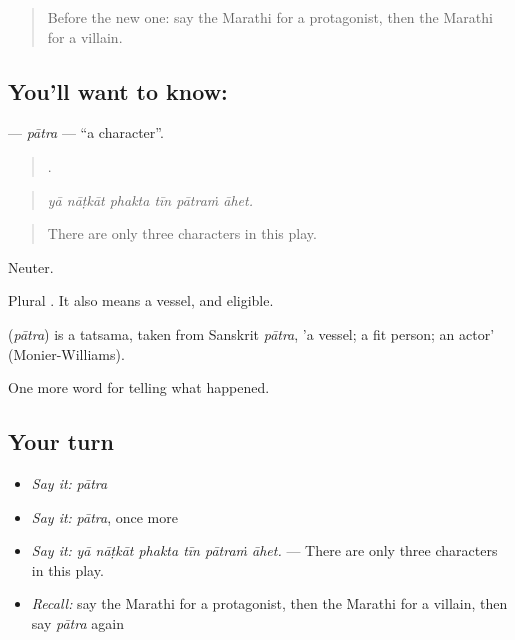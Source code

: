 \label{lesson:MR-C339-patra}



\begin{quote}
Before the new one: say the Marathi for a protagonist, then the Marathi for a villain.
\end{quote}

\subsection*{You'll want to know: }
\textbf{} — \emph{pātra} — \textquotedblleft{}a character\textquotedblright{}.

\begin{quote}
     .
\end{quote}

\begin{quote}
\emph{yā nāṭkāt phakta tīn pātraṁ āhet.}
\end{quote}

\begin{quote}
There are only three characters in this play.
\end{quote}

Neuter.

Plural . It also means a vessel, and eligible.

\begin{cousinweb}
\textbf{} (\emph{pātra}) is a tatsama, taken from Sanskrit \emph{pātra}, 'a vessel; a fit person; an actor' (Monier-Williams).
\end{cousinweb}

\begin{grammarlens}[title={What you've built}]
One more word for telling what happened.
\end{grammarlens}

\subsection*{Your turn}
\begin{itemize}
\raggedright
  \item \emph{Say it:} \emph{pātra}
  \item \emph{Say it:} \emph{pātra}, once more
  \item \emph{Say it:} \emph{yā nāṭkāt phakta tīn pātraṁ āhet.} — There are only three characters in this play.
  \item \emph{Recall:} say the Marathi for a protagonist, then the Marathi for a villain, then say \emph{pātra} again
\end{itemize}

